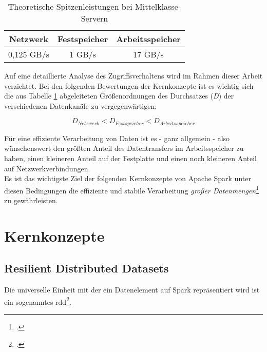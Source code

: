 \begin{table}[ht]
	\centering %
	\begin{tabular}{c c c} %
		\hline\hline %
		Netzwerk & Festspeicher & Arbeitsspeicher\\ [0.5ex] %
		\hline %
		0,125 GB/s & 1 GB/s & 17 GB/s \\ %
		\hline %
	\end{tabular}
	\caption{Theoretische Spitzenleistungen bei Mittelklasse-Servern} %
	\label{table:vgldurchsatz} %
\end{table}

Auf eine detaillierte Analyse des Zugriffsverhaltens wird im Rahmen dieser Arbeit verzichtet. Bei den folgenden Bewertungen der Kernkonzepte ist es wichtig sich die aus Tabelle \ref{table:vgldurchsatz} abgeleiteten Größenordnungen des Durchsatzes (\textit{D}) der verschiedenen Datenkanäle zu vergegenwärtigen:

\begin{equation*}
	D_{Netzwerk} < D_{Festspeicher} < D_{Arbeitsspeicher}
\end{equation*}

Für eine effiziente Verarbeitung von Daten ist es - ganz allgemein - also wünschenswert den größten Anteil des Datentransfers im Arbeitsspeicher zu haben, einen kleineren Anteil auf der Festplatte und einen noch kleineren Anteil auf Netzwerkverbindungen.\\

Es ist das wichtigste Ziel der folgenden Kernkonzepte von Apache Spark unter diesen Bedingungen die effiziente und stabile Verarbeitung \textit{großer Datenmengen}\footcite{Sam14} zu gewährleisten.\\

\section{Kernkonzepte}

\subsection{Resilient Distributed Datasets}
Die universelle Einheit mit der ein Datenelement auf Spark repräsentiert wird ist ein sogenanntes \gls{rdd}\footcite{Mat12}.\\

